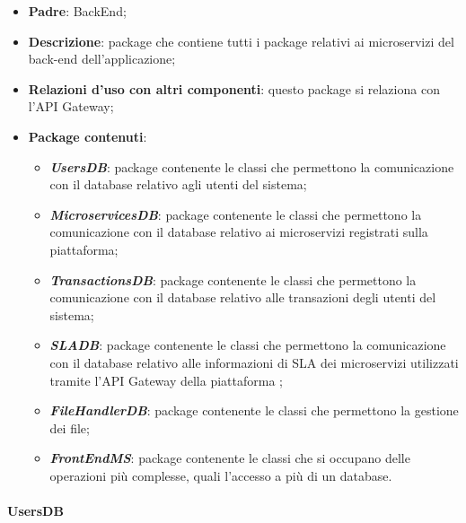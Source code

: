 \begin{itemize}
	\item \textbf{Padre}: BackEnd;
	
	\item \textbf{Descrizione}: package che contiene tutti i package relativi ai microservizi del back-end dell'applicazione;
	
	\item \textbf{Relazioni d'uso con altri componenti}: questo package si relaziona con l'API Gateway;
	
	\item \textbf{Package contenuti}:
	\begin{itemize}
		\item \textbf{\textit{UsersDB}}: package contenente le classi che permettono la comunicazione con il database relativo agli utenti del sistema;
		
		\item \textbf{\textit{MicroservicesDB}}: package contenente le classi che permettono la comunicazione con il database relativo ai microservizi registrati sulla piattaforma;
		
		\item \textbf{\textit{TransactionsDB}}: package contenente le classi che permettono la comunicazione con il database relativo alle transazioni degli utenti del sistema;
		
		\item \textbf{\textit{SLADB}}: package contenente le classi che permettono la comunicazione con il database relativo alle informazioni di SLA dei microservizi utilizzati tramite l'API Gateway della piattaforma \progetto;
		
		\item \textbf{\textit{FileHandlerDB}}: package contenente le classi che permettono la gestione dei file;
		
		\item \textbf{\textit{FrontEndMS}}: package contenente le classi che si occupano delle operazioni più complesse, quali l'accesso a più di un database.
	\end{itemize}
\end{itemize}

\paragraph{UsersDB}


